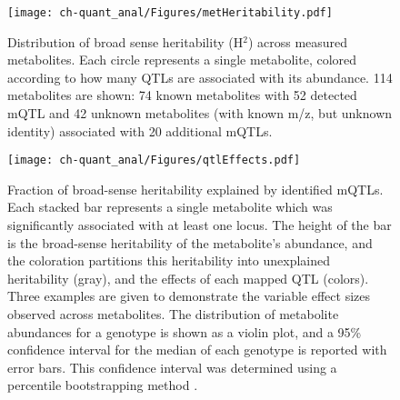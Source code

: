 \begin{figure}[h!]
\begin{center}
\texttt{[image: ch-quant\_anal/Figures/metHeritability.pdf]}
\caption[Distribution of broad sense heritability (H$^{2}$) across measured metabolites]{Distribution of broad sense heritability (H$^{2}$) across measured metabolites. Each circle represents a single metabolite, colored according to how many QTLs are associated with its abundance.  114 metabolites are shown: 74 known metabolites with 52 detected mQTL and 42 unknown metabolites (with known m/z, but unknown identity) associated with 20 additional mQTLs.}
\label{ch-quant_anal:metHeritability}
\end{center}
\end{figure}

\begin{figure}[h!]
\begin{center}
\texttt{[image: ch-quant\_anal/Figures/qtlEffects.pdf]}
\caption[Fraction of broad-sense heritability explained by identified mQTLs]{Fraction of broad-sense heritability explained by identified mQTLs.  Each stacked bar represents a single metabolite which was significantly associated with at least one locus.  The height of the bar is the broad-sense heritability of the metabolite's abundance, and the coloration partitions this heritability into unexplained heritability (gray), and the effects of each mapped QTL (colors).  Three examples are given to demonstrate the variable effect sizes observed across metabolites.  The distribution of metabolite abundances for a genotype is shown as a violin plot, and a 95\% confidence interval for the median of each genotype is reported with error bars.  This confidence interval was determined using a percentile bootstrapping method \cite{Davison:1997vn}.}
\label{ch-quant_anal:qtlEffects}
\end{center}
\end{figure}

